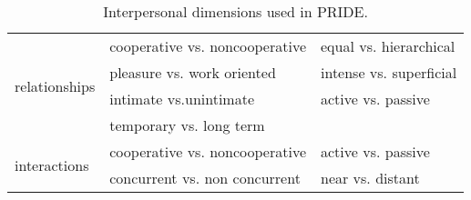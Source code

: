 \begin{table}[t!]
\centering
\begin{adjustbox}{width=0.7\textwidth}
\begin{tabular}{@{}l|ll@{}}
\multirow{4}{*}{relationships} & cooperative vs. noncooperative & equal vs. hierarchical\\ 
 & pleasure vs. work oriented & intense vs. superficial \\ 
 & intimate vs.unintimate & active vs. passive \\ 
 & temporary vs. long term \\ \hline
\multirow{2}{*}{interactions}  & cooperative vs. noncooperative & active vs. passive \\ 
 & concurrent vs. non concurrent & near vs. distant \\                                                          
\end{tabular}
\end{adjustbox}
\caption{Interpersonal dimensions used in PRIDE.}
\label{dimensions}
\end{table}


